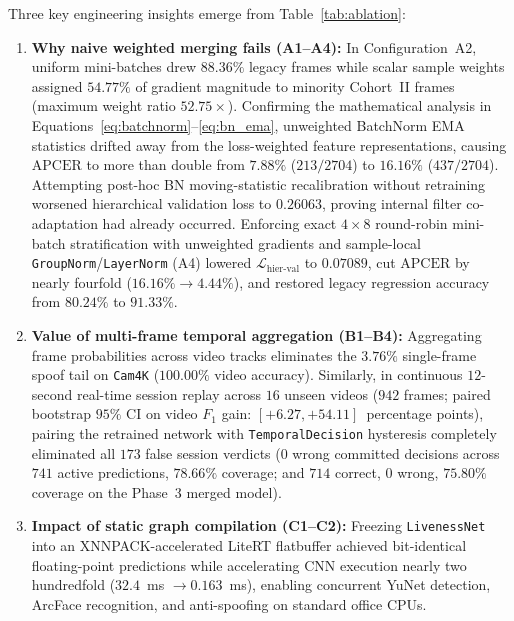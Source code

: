 Three key engineering insights emerge from Table~\ref{tab:ablation}:
\begin{enumerate}
    \item \textbf{Why naive weighted merging fails (A1--A4):} In Configuration~A2, uniform mini-batches drew $88.36\%$ legacy frames while scalar sample weights assigned $54.77\%$ of gradient magnitude to minority Cohort~II frames (maximum weight ratio $52.75\times$). Confirming the mathematical analysis in Equations~\eqref{eq:batchnorm}--\eqref{eq:bn_ema}, unweighted BatchNorm EMA statistics drifted away from the loss-weighted feature representations, causing $\text{APCER}$ to more than double from $7.88\%$ ($213/2704$) to $16.16\%$ ($437/2704$). Attempting post-hoc BN moving-statistic recalibration without retraining worsened hierarchical validation loss to $0.26063$, proving internal filter co-adaptation had already occurred. Enforcing exact $4\times8$ round-robin mini-batch stratification with unweighted gradients and sample-local \texttt{GroupNorm}/\texttt{LayerNorm} (A4) lowered $\mathcal{L}_{\text{hier-val}}$ to $0.07089$, cut $\text{APCER}$ by nearly fourfold ($16.16\% \to 4.44\%$), and restored legacy regression accuracy from $80.24\%$ to $91.33\%$.
    \item \textbf{Value of multi-frame temporal aggregation (B1--B4):} Aggregating frame probabilities across video tracks eliminates the $3.76\%$ single-frame spoof tail on \texttt{Cam4K} ($100.00\%$ video accuracy). Similarly, in continuous $12$-second real-time session replay across $16$ unseen videos ($942$ frames; paired bootstrap $95\%$ CI on video $F_1$ gain: $[+6.27, +54.11]$~percentage points), pairing the retrained network with \texttt{TemporalDecision} hysteresis completely eliminated all $173$ false session verdicts ($0$ wrong committed decisions across $741$ active predictions, $78.66\%$ coverage; and $714$ correct, $0$ wrong, $75.80\%$ coverage on the Phase~3 merged model).
    \item \textbf{Impact of static graph compilation (C1--C2):} Freezing \texttt{LivenessNet} into an XNNPACK-accelerated LiteRT flatbuffer achieved bit-identical floating-point predictions while accelerating CNN execution nearly two hundredfold ($32.4$~ms $\to 0.163$~ms), enabling concurrent YuNet detection, ArcFace recognition, and anti-spoofing on standard office CPUs.
\end{enumerate}
